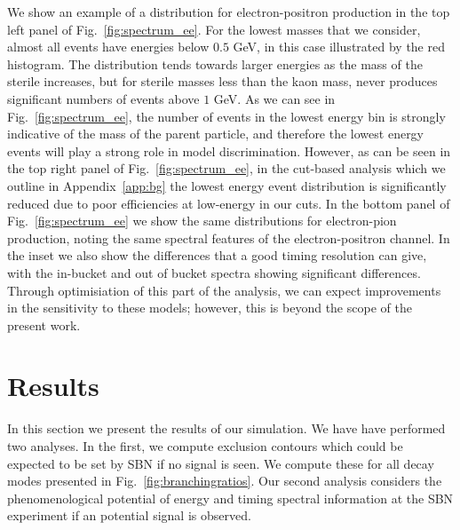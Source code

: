 \documentclass[11pt, a4paper]{article}
\newcommand{\reffig}[1]{Fig.~\ref{#1}}
\newcommand{\refapp}[1]{Appendix~\ref{#1}}
\begin{document}
We show an example of a distribution for electron-positron production in the
top left panel of \reffig{fig:spectrum_ee}. For the lowest masses that we consider,
almost all events have energies below $0.5$ GeV, in this case illustrated by
the red histogram. The distribution tends towards larger energies as the mass
of the sterile increases, but for sterile masses less than the kaon mass, never
produces significant numbers of events above $1$ GeV. As we can see in
\reffig{fig:spectrum_ee}, the number of events in the lowest energy bin is
strongly indicative of the mass of the parent particle, and therefore the
lowest energy events will play a strong role in model discrimination. However,
as can be seen in the top right panel of \reffig{fig:spectrum_ee}, in the cut-based
analysis which we outline in \refapp{app:bg} the lowest energy event
distribution is significantly reduced due to poor efficiencies at low-energy in
our cuts. In the bottom panel of \reffig{fig:spectrum_ee} we show the same distributions for electron-pion production, noting the same spectral features of the electron-positron channel. In the inset we also show the differences that a good timing resolution can give, with the in-bucket and out of bucket spectra showing significant differences.  Through optimisiation of this part of the analysis, we can expect
improvements in the sensitivity to these models; however, this is beyond the
scope of the present work.  



%
%
%

\section{\label{sec:sensitivities}Results}

In this section we present the results of our simulation. We have have
performed two analyses. In the first, we compute exclusion contours which could
be expected to be set by SBN if no signal is seen. We compute these for all
decay modes presented in \reffig{fig:branchingratios}. Our second analysis
considers the phenomenological potential of energy and timing spectral information at the SBN
experiment if an potential signal is observed. 
\end{document}
